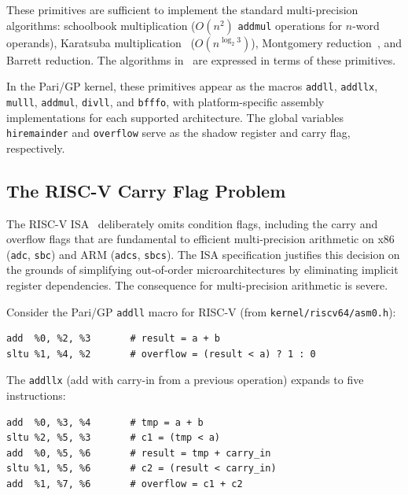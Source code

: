 \documentclass[11pt,a4paper]{article}
\begin{document}
These primitives are sufficient to implement the standard multi-precision
algorithms: schoolbook multiplication ($O(n^2)$ \texttt{addmul} operations for
$n$-word operands), Karatsuba multiplication~\cite{karatsuba1962} ($O(n^{\log_2 3})$),
Montgomery reduction~\cite{montgomery1985}, and Barrett reduction.  The
algorithms in~\cite{brent2010,knuth1997} are expressed in terms of these
primitives.

In the Pari/GP kernel, these primitives appear as the macros \texttt{addll},
\texttt{addllx}, \texttt{mulll}, \texttt{addmul}, \texttt{divll}, and
\texttt{bfffo}, with platform-specific assembly implementations for each
supported architecture.  The global variables \texttt{hiremainder} and
\texttt{overflow} serve as the shadow register and carry flag, respectively.

\subsection{The RISC-V Carry Flag Problem}
\label{sec:carry-problem}

The RISC-V ISA~\cite{riscvisa2019} deliberately omits condition flags, including
the carry and overflow flags that are fundamental to efficient multi-precision
arithmetic on x86 (\texttt{adc}, \texttt{sbc}) and ARM (\texttt{adcs},
\texttt{sbcs}).  The ISA specification justifies this decision on the grounds
of simplifying out-of-order microarchitectures by eliminating implicit register
dependencies.  The consequence for multi-precision arithmetic is severe.

Consider the Pari/GP \texttt{addll} macro for RISC-V (from
\texttt{kernel/riscv64/asm0.h}):

\begin{lstlisting}[style=asm,caption={Pari/GP \texttt{addll} for RISC-V: two instructions where x86 requires one (\texttt{add}+\texttt{adc}).},label=lst:addll]
add  %0, %2, %3       # result = a + b
sltu %1, %4, %2       # overflow = (result < a) ? 1 : 0
\end{lstlisting}

The \texttt{addllx} (add with carry-in from a previous operation) expands to
five instructions:

\begin{lstlisting}[style=asm,caption={Pari/GP \texttt{addllx} for RISC-V: five instructions per carry-propagating addition.},label=lst:addllx]
add  %0, %3, %4       # tmp = a + b
sltu %2, %5, %3       # c1 = (tmp < a)
add  %0, %5, %6       # result = tmp + carry_in
sltu %1, %5, %6       # c2 = (result < carry_in)
add  %1, %7, %6       # overflow = c1 + c2
\end{lstlisting}
\end{document}
